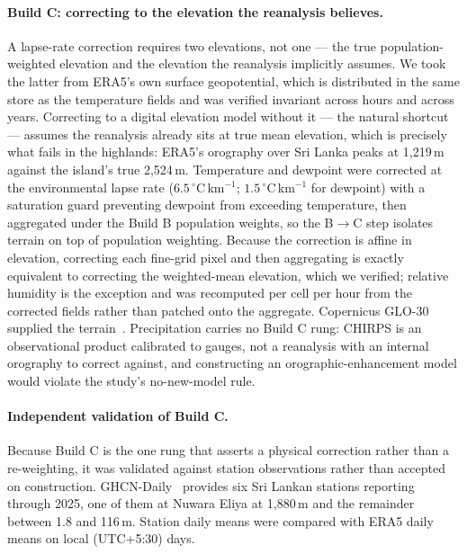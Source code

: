 \paragraph{Build C: correcting to the elevation the reanalysis believes.} A lapse-rate correction requires two elevations, not one --- the true population-weighted elevation and the elevation the reanalysis implicitly assumes. We took the latter from ERA5's own surface geopotential, which is distributed in the same store as the temperature fields and was verified invariant across hours and across years. Correcting to a digital elevation model without it --- the natural shortcut --- assumes the reanalysis already sits at true mean elevation, which is precisely what fails in the highlands: ERA5's orography over Sri Lanka peaks at 1{,}219\,m against the island's true 2{,}524\,m. Temperature and dewpoint were corrected at the environmental lapse rate ($6.5\,^{\circ}$C\,km$^{-1}$; $1.5\,^{\circ}$C\,km$^{-1}$ for dewpoint) with a saturation guard preventing dewpoint from exceeding temperature, then aggregated under the Build B population weights, so the B$\to$C step isolates terrain on top of population weighting. Because the correction is affine in elevation, correcting each fine-grid pixel and then aggregating is exactly equivalent to correcting the weighted-mean elevation, which we verified; relative humidity is the exception and was recomputed per cell per hour from the corrected fields rather than patched onto the aggregate. Copernicus GLO-30 supplied the terrain~\cite{CopernicusDEM2021}. Precipitation carries no Build C rung: CHIRPS is an observational product calibrated to gauges, not a reanalysis with an internal orography to correct against, and constructing an orographic-enhancement model would violate the study's no-new-model rule.

\paragraph{Independent validation of Build C.} Because Build C is the one rung that asserts a physical correction rather than a re-weighting, it was validated against station observations rather than accepted on construction. GHCN-Daily~\cite{Menne2012} provides six Sri Lankan stations reporting through 2025, one of them at Nuwara Eliya at 1{,}880\,m and the remainder between 1.8 and 116\,m. Station daily means were compared with ERA5 daily means on local (UTC+5:30) days.

